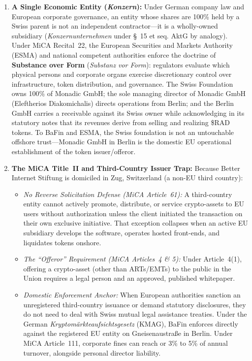 \documentclass[a4paper,11pt,twoside,parskip=half-,headings=small]{scrartcl}
\begin{document}
\begin{enumerate}
  \item \textbf{A Single Economic Entity (\emph{Konzern}):} Under German company law and European corporate governance, an entity whose shares are 100\% held by a Swiss parent is not an independent contractor---it is a wholly-owned subsidiary (\emph{Konzernunternehmen} under \S~15 et seq. AktG by analogy). Under MiCA Recital~22, the European Securities and Markets Authority (ESMA) and national competent authorities enforce the doctrine of \textbf{Substance over Form} (\emph{Substanz vor Form}): regulators evaluate which physical persons and corporate organs exercise discretionary control over infrastructure, token distribution, and governance. The Swiss Foundation owns 100\% of Monadic GmbH; the sole managing director of Monadic GmbH (Eleftherios Diakomichalis) directs operations from Berlin; and the Berlin GmbH carries a  receivable against its Swiss owner while acknowledging in its statutory notes that its revenues derive from selling and realizing \$RAD tokens. To BaFin and ESMA, the Swiss foundation is not an untouchable offshore trust---Monadic GmbH in Berlin is the domestic EU operational establishment of the token issuer/offeror.
  \item \textbf{The MiCA Title~II and Third-Country Issuer Trap:} Because Better Internet Stiftung is domiciled in Zug, Switzerland (a non-EU third country):
  \begin{itemize}
    \item \emph{No Reverse Solicitation Defense (MiCA Article~61):} A third-country entity cannot actively promote, distribute, or service crypto-assets to EU users without authorization unless the client initiated the transaction on their own exclusive initiative. That exception collapses when an active EU subsidiary develops the software, operates hosted front-ends, and liquidates tokens onshore.
    \item \emph{The ``Offeror'' Requirement (MiCA Articles~4 \& 5):} Under Article~4(1), offering a crypto-asset (other than ARTs/EMTs) to the public in the Union requires a legal person and an approved, published whitepaper.
    \item \emph{Domestic Enforcement Anchor:} When European authorities sanction an unregistered third-country issuance or demand statutory disclosures, they do not need to deal with Swiss mutual legal assistance treaties. Under the German \emph{Kryptom{\"a}rkteaufsichtsgesetz} (KMAG), BaFin enforces directly against the registered EU entity on Gneisenaustra{\ss}e in Berlin. Under MiCA Article~111, corporate fines can reach  or 3\% to 5\% of annual turnover, alongside personal director liability.

\end{itemize}
\end{enumerate}
\end{document}
